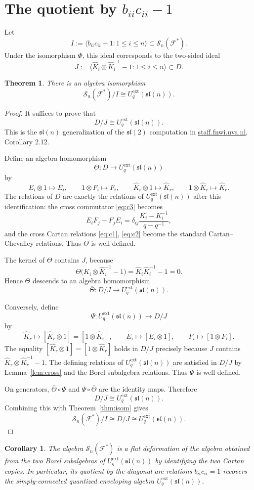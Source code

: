 \documentclass[11pt]{article}
\newtheorem{theorem}{Theorem}
\newtheorem{corollary}{Corollary}
\theoremstyle{definition}
\newcommand{\Uq}{U_q^{\mathrm{ext}}}
\newcommand{\slie}{\mathfrak{sl}}
\newcommand{\F}{\mathcal{F}}
\newcommand{\cS}{\mathcal{S}}
\newcommand{\KK}{\hat K}
\begin{document}
\section{The quotient by $b_{ii}c_{ii}-1$}

Let
\[
I:=\bigl\langle b_{ii}c_{ii}-1 : 1\le i\le n\bigr\rangle
\subset \cS_n(\F^*).
\]
Under the isomorphism $\Phi$, this ideal corresponds to the two-sided ideal
\[
J:=\bigl\langle \KK_i\otimes \KK_i^{-1}-1 : 1\le i\le n\bigr\rangle
\subset D.
\]

\begin{theorem}
\label{thm:quotient}
There is an algebra isomorphism
\[
\cS_n(\F^*)/I
\cong
\Uq(\slie(n)).
\]
\end{theorem}

\begin{proof}
It suffices to prove that
\[
D/J\cong \Uq(\slie(n)).
\]
This is the $\slie(n)$ generalization of the $\slie(2)$ computation in
\href{https://staff.fnwi.uva.nl/j.v.stokman/quantumdouble2.pdf}{staff.fnwi.uva.nl},
Corollary 2.12.

Define an algebra homomorphism
\[
\Theta:D\longrightarrow \Uq(\slie(n))
\]
by
\[
E_i\otimes 1\mapsto E_i,\qquad
1\otimes F_i\mapsto F_i,\qquad
\KK_r\otimes 1\mapsto \KK_r,\qquad
1\otimes \KK_r\mapsto \KK_r.
\]
The relations of $D$ are exactly the relations of $\Uq(\slie(n))$ after this
identification: the cross commutator \eqref{eq:c3} becomes
\[
E_iF_j-F_jE_i=\delta_{ij}\frac{K_i-K_i^{-1}}{q-q^{-1}},
\]
and the cross Cartan relations \eqref{eq:c1}, \eqref{eq:c2} become the
standard Cartan--Chevalley relations. Thus $\Theta$ is well defined.

The kernel of $\Theta$ contains $J$, because
\[
\Theta\bigl(\KK_i\otimes \KK_i^{-1}-1\bigr)
=
\KK_i\KK_i^{-1}-1=0.
\]
Hence $\Theta$ descends to an algebra homomorphism
\[
\overline\Theta:D/J\longrightarrow \Uq(\slie(n)).
\]

Conversely, define
\[
\Psi:\Uq(\slie(n))\longrightarrow D/J
\]
by
\[
\KK_r\mapsto [\KK_r\otimes 1]=[1\otimes \KK_r],\qquad
E_i\mapsto [E_i\otimes 1],\qquad
F_i\mapsto [1\otimes F_i].
\]
The equality $[\KK_r\otimes 1]=[1\otimes \KK_r]$ holds in $D/J$ precisely because
$J$ contains $\KK_r\otimes \KK_r^{-1}-1$. The defining relations of
$\Uq(\slie(n))$ are satisfied in $D/J$ by Lemma~\ref{lem:cross} and the Borel
subalgebra relations. Thus $\Psi$ is well defined.

On generators, $\overline\Theta\circ\Psi$ and
$\Psi\circ\overline\Theta$ are the identity maps. Therefore
\[
D/J\cong \Uq(\slie(n)).
\]
Combining this with Theorem~\ref{thm:isom} gives
\[
\cS_n(\F^*)/I\cong D/J\cong \Uq(\slie(n)).
\]
\end{proof}

\begin{corollary}
The algebra $\cS_n(\F^*)$ is a flat deformation of the algebra obtained from
the two Borel subalgebras of $\Uq(\slie(n))$ by identifying the two Cartan
copies. In particular, its quotient by the diagonal arc relations
$b_{ii}c_{ii}=1$ recovers the simply-connected quantized enveloping algebra
$\Uq(\slie(n))$.
\end{corollary}
\end{document}
